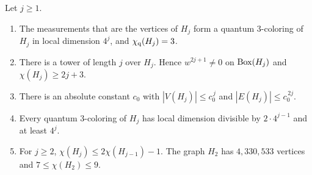 \begin{theorem}\label{thm:Hj}
Let $j\ge1$.
\begin{enumerate}
\item[(a)] The measurements that are the vertices of $H_j$ form a quantum $3$-coloring of $H_j$ in local dimension $4^j$, and $\chi_{\mathrm q}(H_j)=3$.
\item[(b)] There is a tower of length $j$ over $H_j$. Hence $w^{2j+1}\ne0$ on $\operatorname{Box}(H_j)$ and $\chi(H_j)\ge2j+3$.
\item[(c)] There is an absolute constant $c_0$ with $|V(H_j)|\le c_0^{\,j}$ and $|E(H_j)|\le c_0^{\,2j}$.
\item[(d)] Every quantum $3$-coloring of $H_j$ has local dimension divisible by $2\cdot4^{j-1}$ and at least $4^j$.
\item[(e)] For $j\ge2$, $\chi(H_j)\le2\chi(H_{j-1})-1$. The graph $H_2$ has $4{,}330{,}533$ vertices and $7\le\chi(H_2)\le9$.
\end{enumerate}
\end{theorem}
